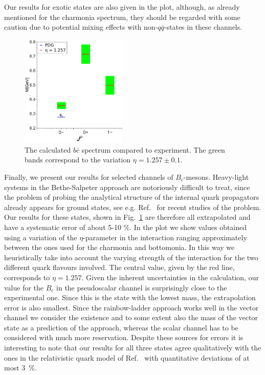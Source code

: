 Our results for exotic states are also given in the plot, although, as already mentioned 
for the charmonia spectrum, they should be regarded with some caution due to potential
mixing effects with non-$q\bar{q}$-states in these channels.

%
%
%
%
%

%
\begin{figure}[!thp]
  \begin{center}
    \includegraphics[width=0.45\textwidth]{figures/spectrum_bc}
    \caption{The calculated $b\bar{c}$ spectrum compared to experiment. The green bands correspond 
             to the variation $\eta=1.257\pm0.1$.}\label{fig:spectrumbc}
  \end{center}
\end{figure}

Finally, we present our results for selected channels of $B_c$-mesons. 
Heavy-light systems in the Bethe-Salpeter
approach are notoriously difficult to treat, since the problem of probing the analytical
structure of the internal quark propagators already appears for ground states, see e.g.
Ref.~\cite{Rojas:2014aka,Gomez-Rocha:2014vsa} for recent studies of the problem. Our results for these states,
shown in Fig.~\ref{fig:spectrumbc} are therefore all extrapolated and have a systematic error
of about 5-10 \%. In the plot we show values obtained using a variation of the $\eta$-parameter
in the interaction ranging approximately between the ones used for the charmonia and bottomonia.
In this way we heuristically take into account the varying strength of the interaction for the
two different quark flavours involved. The central value, given by the red line, corresponds 
to $\eta=1.257$. Given the inherent uncertainties in the calculation, our value for the $B_c$
in the pseudoscalar channel is surprisingly close to the experimental one. Since this is the
state with the lowest mass, the extrapolation error is also smallest. Since the rainbow-ladder
approach works well in the vector channel we consider the existence and to some extent also the 
mass of the vector state as a prediction of the approach, whereas the scalar channel has to
be considered with much more reservation. Despite these sources for errors it is interesting to
note that our results for all three states agree qualitatively with the ones in the relativistic 
quark model of Ref.~\cite{Ebert:2011jc} with quantitative deviations of at most 3~\%.

